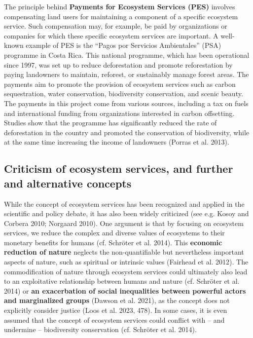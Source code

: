 \documentclass[
  a4paper,
  DIV=11,
  numbers=noendperiod,
  oneside,
  openany]{scrreprt}
\begin{document}
The principle behind \textbf{Payments for Ecosystem Services (PES)}
involves compensating land users for maintaining a component of a
specific ecosystem service. Such compensation may, for example, be paid
by organizations or companies for which these specific ecosystem
services are important. A well-known example of PES is the ``Pagos por
Servicios Ambientales'' (PSA) programme in Costa Rica. This national
programme, which has been operational since 1997, was set up to reduce
deforestation and promote reforestation by paying landowners to
maintain, reforest, or sustainably manage forest areas. The payments aim
to promote the provision of ecosystem services such as carbon
sequestration, water conservation, biodiversity conservation, and scenic
beauty. The payments in this project come from various sources,
including a tax on fuels and international funding from organizations
interested in carbon offsetting. Studies show that the programme has
significantly reduced the rate of deforestation in the country and
promoted the conservation of biodiversity, while at the same time
increasing the income of landowners (Porras et al. 2013).

\subsection{Criticism of ecosystem services, and further and alternative
concepts}\label{criticism-of-ecosystem-services-and-further-and-alternative-concepts}

While the concept of ecosystem services has been recognized and applied
in the scientific and policy debate, it has also been widely criticized
(see e.g. Kosoy and Corbera 2010; Norgaard 2010). One argument is that
by focusing on ecosystem services, we reduce the complex and diverse
values of ecosystems to their monetary benefits for humans (cf.
{Schröter et al.} 2014). This \textbf{economic reduction of nature}
neglects the non-quantifiable but nevertheless important aspects of
nature, such as spiritual or intrinsic values (Fairhead et al. 2012).
The commodification of nature through ecosystem services could
ultimately also lead to an exploitative relationship between humans and
nature (cf. {Schröter et al.} 2014) or \textbf{an exacerbation of social
inequalities between powerful actors and marginalized groups} (Dawson et
al. 2021), as the concept does not explicitly consider justice (Loos et
al. 2023, 478). In some cases, it is even assumed that the concept of
ecosystem services could conflict with -- and undermine -- biodiversity
conservation (cf. {Schröter et al.} 2014).
\end{document}
